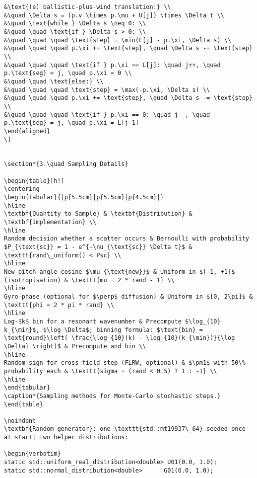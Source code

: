 \begin{verbatim}
&\text{(e) ballistic-plus-wind translation:} \\
&\quad \Delta s = (p.v \times p.\mu + U[j]) \times \Delta t \\
&\quad \text{while } \Delta s \neq 0: \\
&\quad \quad \text{if } \Delta s > 0: \\
&\quad \quad \quad \text{step} = \min(L[j] - p.\xi, \Delta s) \\
&\quad \quad \quad p.\xi += \text{step}, \quad \Delta s -= \text{step} \\
&\quad \quad \quad \text{if } p.\xi == L[j]: \quad j++, \quad p.\text{seg} = j, \quad p.\xi = 0 \\
&\quad \quad \text{else:} \\
&\quad \quad \quad \text{step} = \max(-p.\xi, \Delta s) \\
&\quad \quad \quad p.\xi += \text{step}, \quad \Delta s -= \text{step} \\
&\quad \quad \quad \text{if } p.\xi == 0: \quad j--, \quad p.\text{seg} = j, \quad p.\xi = L[j-1]
\end{aligned}
\]


\section*{3.\quad Sampling Details}

\begin{table}[h!]
\centering
\begin{tabular}{|p{5.5cm}|p{5.5cm}|p{4.5cm}|}
\hline
\textbf{Quantity to Sample} & \textbf{Distribution} & \textbf{Implementation} \\
\hline
Random decision whether a scatter occurs & Bernoulli with probability $P_{\text{sc}} = 1 - e^{-\nu_{\text{sc}} \Delta t}$ & \texttt{rand\_uniform() < Psc} \\
\hline
New pitch-angle cosine $\mu_{\text{new}}$ & Uniform in $[-1, +1]$ (isotropisation) & \texttt{mu = 2 * rand - 1} \\
\hline
Gyro-phase (optional for $\perp$ diffusion) & Uniform in $[0, 2\pi]$ & \texttt{phi = 2 * pi * rand} \\
\hline
Log-$k$ bin for a resonant wavenumber & Precompute $\log_{10} k_{\min}$, $\log \Delta$; binning formula: $\text{bin} = \text{round}\left( \frac{\log_{10}(k) - \log_{10}(k_{\min})}{\log \Delta} \right)$ & Precompute and bin \\
\hline
Random sign for cross-field step (FLRW, optional) & $\pm1$ with 50\% probability each & \texttt{sigma = (rand < 0.5) ? 1 : -1} \\
\hline
\end{tabular}
\caption*{Sampling methods for Monte-Carlo stochastic steps.}
\end{table}

\noindent
\textbf{Random generator}: one \texttt{std::mt19937\_64} seeded once at start; two helper distributions:

\begin{verbatim}
static std::uniform_real_distribution<double> U01(0.0, 1.0);
static std::normal_distribution<double>      G01(0.0, 1.0);
\end{verbatim}


